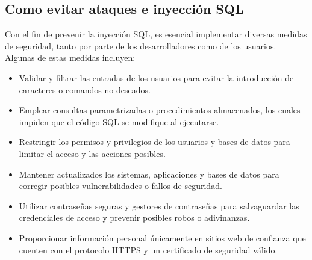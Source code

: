 \documentclass[11pt]{report}
\begin{document}
\subsection{Como evitar ataques e inyección SQL}
Con el fin de prevenir la inyección SQL, es esencial implementar diversas medidas de
seguridad, tanto por parte de los desarrolladores como de los usuarios. Algunas de estas
medidas incluyen:
\begin{itemize}
\item Validar y filtrar las entradas de los usuarios para evitar la introducción de caracteres
o comandos no deseados.
\item Emplear consultas parametrizadas o procedimientos almacenados, los cuales
impiden que el código SQL se modifique al ejecutarse.
\item Restringir los permisos y privilegios de los usuarios y bases de datos para limitar el
acceso y las acciones posibles.
\item Mantener actualizados los sistemas, aplicaciones y bases de datos para corregir
posibles vulnerabilidades o fallos de seguridad.
\item Utilizar contraseñas seguras y gestores de contraseñas para salvaguardar las
credenciales de acceso y prevenir posibles robos o adivinanzas.
\item Proporcionar información personal únicamente en sitios web de confianza que
cuenten con el protocolo HTTPS y un certificado de seguridad válido.
\end{itemize}

\cleardoublepage
\end{document}
